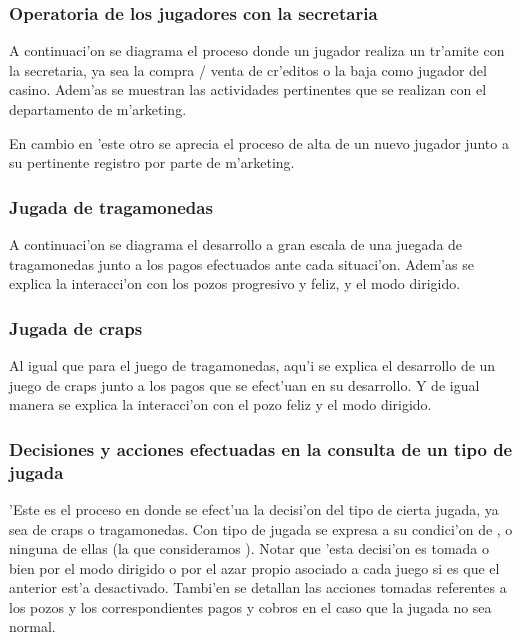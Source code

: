 \subsubsection{Operatoria de los jugadores con la secretaria}
A continuaci'on se diagrama el proceso donde un jugador realiza un tr'amite con la secretaria, ya sea la compra / venta de cr'editos o la baja como jugador del casino. Adem'as se muestran las actividades pertinentes que se realizan con el departamento de m'arketing. 


\clearpage

En cambio en 'este otro se aprecia el proceso de alta de un nuevo jugador junto a su pertinente registro por parte de m'arketing.



\clearpage




\subsubsection{Jugada de tragamonedas}
A continuaci'on se diagrama el desarrollo a gran escala de una juegada de tragamonedas junto a los pagos efectuados ante cada situaci'on. Adem'as se explica la interacci'on con los pozos progresivo y feliz, y el modo dirigido.


\clearpage





\subsubsection{Jugada de craps}
Al igual que para el juego de tragamonedas, aqu'i se explica el desarrollo de un juego de craps junto a los pagos que se efect'uan en su desarrollo. Y de igual manera se explica la interacci'on con el pozo feliz y el modo dirigido.


\clearpage





\subsubsection{Decisiones y acciones efectuadas en la consulta de un tipo de jugada}
'Este es el proceso en donde se efect'ua la decisi'on del tipo de cierta jugada, ya sea de craps o tragamonedas. Con tipo de jugada se expresa a su condici'on de ,  o ninguna de ellas (la que consideramos ). Notar que 'esta decisi'on es tomada o bien por el modo dirigido o por el azar propio asociado a cada juego si es que el anterior est'a desactivado. Tambi'en se detallan las acciones tomadas referentes a los pozos y los correspondientes pagos y cobros en el caso que la jugada no sea normal.






